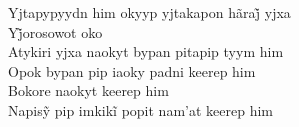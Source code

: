 \begin{linenumbers}
 
\noindent   Yjtapypyydn him okyyp yjtakapon hãraj̃ yjxa\\
  Yj̃orosowot oko\\
  Atykiri yjxa naokyt bypan pitapip tyym him\\
  Opok bypan pip iaoky padni keerep him\\
  Bokore naokyt keerep him\\
  Napisỹ pip imkikĩ popit nam’at keerep him
 
\end{linenumbers}

\bigskip

